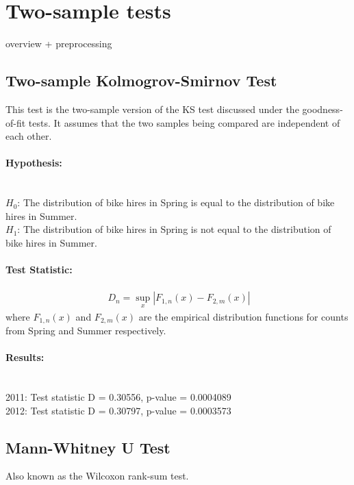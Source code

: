 \section{Two-sample tests}
overview + preprocessing

\subsection{Two-sample Kolmogrov-Smirnov Test}
This test is the two-sample version of the KS test discussed under the goodness-of-fit tests. It assumes that the two samples being compared are independent of each other. 

\paragraph{Hypothesis:} ~\\
$H_0$: The distribution of bike hires in Spring is equal to the distribution of bike hires in Summer. \\
$H_1$: The distribution of bike hires in Spring is not equal to the distribution of bike hires in Summer.

\paragraph{Test Statistic:}
\begin{eqnarray}
\ D_n = \sup_{x} |F_{1,n}(x)-F_{2,m}(x)|
\end{eqnarray}
where $F_{1,n}(x)$ and $F_{2,m}(x)$ are the empirical distribution functions for counts from Spring and Summer respectively.

\paragraph{Results:} ~\\
2011: Test statistic D = 0.30556, p-value = 0.0004089 \\
2012: Test statistic D = 0.30797, p-value = 0.0003573




\subsection{Mann-Whitney U Test}


Also known as the Wilcoxon rank-sum test.

